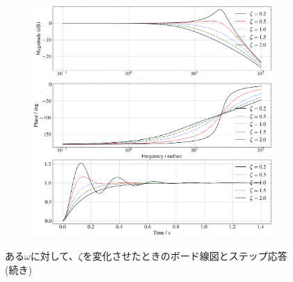 \begin{figure}
	\centering
	\begin{subfigure}{0.8\linewidth}
		\setcounter{subfigure}{2}
		\centering
		\includegraphics[width=0.8\linewidth]{src/figures/bode-phase-step-ideal-group-omega/bode-phase-step-ideal-group-omega-25.png}
		\label{fig:bode-phase-step-ideal-group-omega-25}
	\end{subfigure}
	\caption{ある$\omega$に対して、$\zeta$を変化させたときのボード線図とステップ応答(続き)}
\end{figure}
